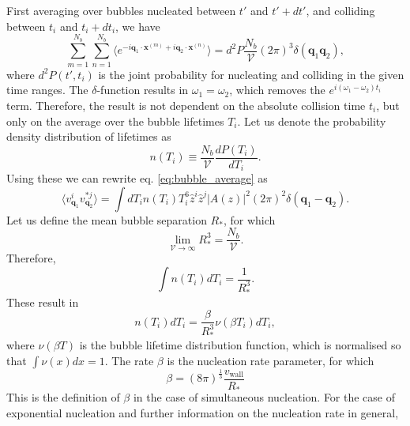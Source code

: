 First averaging over bubbles nucleated between $t'$ and $t' + dt'$, and colliding between $t_i$ and $t_i + dt_i$, we have
\cite[eq. 4.13]{hindmarsh_gw_pt_2019}
\begin{equation}
\sum_{m=1}^{N_b} \sum_{n=1}^{N_b} \langle e^{-i \mathbf{q}_1 \cdot \mathbf{x}^{(m)} + i \mathbf{q}_2 \cdot \mathbf{x}^{(n)}} \rangle
= d^2 P \frac{N_b}{\mathcal{V}} (2\pi)^3 \delta(\mathbf{q}_1 \mathbf{q}_2),
\label{eq:bubble_average}
\end{equation}
where $d^2 P(t', t_i)$ is the joint probability for nucleating and colliding in the given time ranges.
The $\delta$-function results in $\omega_1 = \omega_2$, which removes the $e^{i(\omega_1 - \omega_2)t_i}$ term.
Therefore, the result is not dependent on the absolute collision time $t_i$,
but only on the average over the bubble lifetimes $T_i$.
Let us denote the probability density distribution of lifetimes as
\begin{equation}
n(T_i) \equiv \frac{N_b}{\mathcal{V}} \frac{dP(T_i)}{dT_i}.
\end{equation}
Using these we can rewrite eq. \eqref{eq:bubble_average} as
\begin{equation}
\langle v_{\mathbf{q}_1}^i v_{\mathbf{q}_2}^{*j} \rangle = \int dT_i n(T_i) T_i^6 \hat{z}^i \hat{z}^j |A(z)|^2 (2\pi)^2 \delta(\mathbf{q}_1 - \mathbf{q}_2).
\end{equation}
Let us define the mean bubble separation $R_*$, for which
\begin{equation}
\lim_{\mathcal{V}\rightarrow\infty} R_*^3 = \frac{N_b}{\mathcal{V}}.
\end{equation}
Therefore,
\begin{equation}
\int n(T_i) dT_i = \frac{1}{R_*^3}.
\end{equation}
These result in
\cite[eq. 4.15]{hindmarsh_gw_pt_2019}
\begin{equation}
n(T_i) dT_i = \frac{\beta}{R_*^3} \nu(\beta T_i) dT_i,
\end{equation}
where $\nu (\beta T)$ is the bubble lifetime distribution function, which is normalised so that $\int \nu(x) dx = 1$.
The rate $\beta$ is the nucleation rate parameter, for which
\cite[eq. 4.16]{hindmarsh_gw_pt_2019}
\begin{equation}
\beta = (8 \pi)^{\frac{1}{3}} \frac{v_\text{wall}}{R_*}
\end{equation}
This is the definition of $\beta$ in the case of simultaneous nucleation.
For the case of exponential nucleation and further information on the nucleation rate in general,
